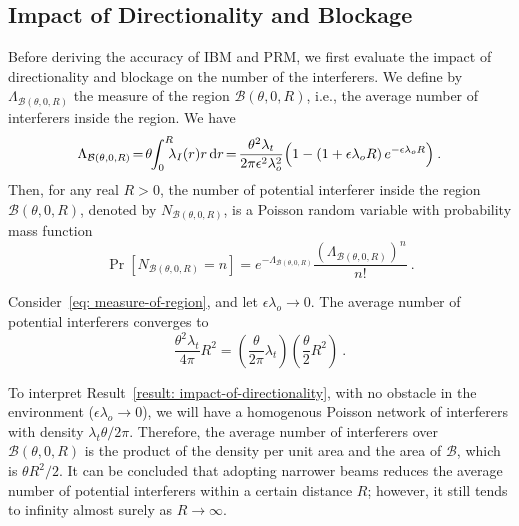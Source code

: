 \documentclass[12pt, draftclsnofoot, onecolumn]{IEEEtran}
\begin{document}
\subsection{Impact of Directionality and Blockage}
Before deriving the accuracy of IBM and PRM, we first evaluate the impact of directionality and blockage on the number of the interferers. We define by $\Lambda_{\mathcal{B}(\theta,0,R)}$ the measure of the region $\mathcal{B}(\theta,0,R)$, i.e., the average number of interferers inside the region. We have
\begin{equation}\label{eq: measure-of-region}
\Lambda_{\mathcal{B}(\theta,0,R)} \hspace{-0.5mm} =  \hspace{-0.5mm}  \theta  \hspace{-1mm} \int_{0}^{R}{ \hspace{-2mm}  \lambda_I (r) r\, \mathrm{d}r}  \hspace{-0.5mm} =  \hspace{-0.5mm} \frac{\theta^2 \lambda_t}{2\pi \epsilon^{2} \lambda_{o}^{2}} \Big( 1 - \left( 1 + \epsilon \lambda_o R \right)e^{- \epsilon \lambda_o R}\Big) \:.
\end{equation}
Then, for any real $R>0$, the number of potential interferer inside the region $\mathcal{B}(\theta,0,R)$, denoted by $N_{\mathcal{B}(\theta,0,R)}$, is a Poisson random variable with probability mass function
\begin{equation}\label{eq: number-of-points}
  \Pr[N_{\mathcal{B}(\theta,0,R)}=n] = e^{-\Lambda_{\mathcal{B}(\theta,0,R)}} \frac{\left(\Lambda_{\mathcal{B}(\theta,0,R)} \right)^{n}}{n!} \:.
\end{equation}

\begin{result}\label{result: impact-of-directionality}
Consider~\eqref{eq: measure-of-region}, and let ${\epsilon\lambda_o \to 0}$. The average number of potential interferers converges to
\begin{equation}
\frac{\theta^2 \lambda_t}{4\pi} R^2 = \left(\frac{\theta}{2\pi} \lambda_t\right) \left( \frac{\theta}{2}R^2\right) \:.
\end{equation}
\end{result}
To interpret Result~\ref{result: impact-of-directionality}, with no obstacle in the environment (${\epsilon\lambda_o \to 0}$), we will have a homogenous Poisson network of interferers with density $\lambda_t \theta/ 2 \pi$. Therefore, the average number of interferers over $\mathcal{B}(\theta,0,R)$ is the product of the density per unit area and the area of $\mathcal{B}$, which is $\theta R^2/2$. It can be concluded that adopting narrower beams reduces the average number of potential interferers within a certain distance $R$; however, it still tends to infinity almost surely as $R \to \infty$.
\end{document}
